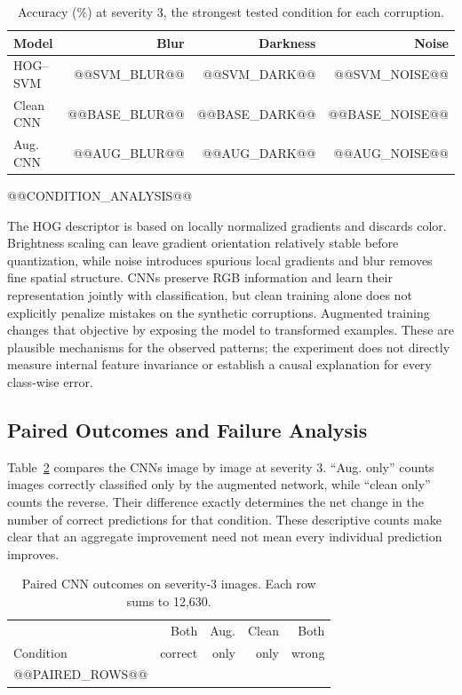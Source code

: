 \documentclass[conference]{IEEEtran}
\begin{document}
\begin{table}[t]\centering
\caption{Accuracy (\%) at severity 3, the strongest tested condition for each corruption.}\label{tab:severe}
\begin{tabular}{lrrr}\toprule
Model & Blur & Darkness & Noise\\\midrule
HOG--SVM & @@SVM_BLUR@@ & @@SVM_DARK@@ & @@SVM_NOISE@@\\
Clean CNN & @@BASE_BLUR@@ & @@BASE_DARK@@ & @@BASE_NOISE@@\\
Aug. CNN & @@AUG_BLUR@@ & @@AUG_DARK@@ & @@AUG_NOISE@@\\\bottomrule
\end{tabular}\end{table}

@@CONDITION_ANALYSIS@@

The HOG descriptor is based on locally normalized gradients and discards color. Brightness scaling can leave gradient orientation relatively stable before quantization, while noise introduces spurious local gradients and blur removes fine spatial structure. CNNs preserve RGB information and learn their representation jointly with classification, but clean training alone does not explicitly penalize mistakes on the synthetic corruptions. Augmented training changes that objective by exposing the model to transformed examples. These are plausible mechanisms for the observed patterns; the experiment does not directly measure internal feature invariance or establish a causal explanation for every class-wise error.

\subsection{Paired Outcomes and Failure Analysis}
Table~\ref{tab:paired} compares the CNNs image by image at severity 3. ``Aug. only'' counts images correctly classified only by the augmented network, while ``clean only'' counts the reverse. Their difference exactly determines the net change in the number of correct predictions for that condition. These descriptive counts make clear that an aggregate improvement need not mean every individual prediction improves.

\begin{table}[t]\centering
\caption{Paired CNN outcomes on severity-3 images. Each row sums to 12,630.}\label{tab:paired}
\begin{tabular}{lrrrr}\toprule
& Both & Aug. & Clean & Both\\
Condition & correct & only & only & wrong\\\midrule
@@PAIRED_ROWS@@
\bottomrule\end{tabular}\end{table}
\end{document}
